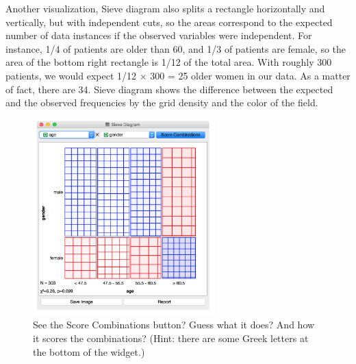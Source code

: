 Another visualization, Sieve diagram also splits a rectangle horizontally and vertically, but with independent cuts, so the areas correspond to the expected number of data instances if the observed variables were independent. For instance, 1/4 of patients are older than 60, and 1/3 of patients are female, so the area of the bottom right rectangle is 1/12 of the total area. With roughly 300 patients, we would expect 1/12 × 300 = 25 older women in our data. As a matter of fact, there are 34. Sieve diagram shows the difference between the expected and the observed frequencies by the grid density and the color of the field.

\begin{figure}
  \flushright
  \includegraphics[width=70mm]{basic_data_exploration-fig7.png}
  \caption{See the Score Combinations button? Guess what it does? And how it scores the combinations? (Hint: there are some Greek letters at the bottom of the widget.)}
  \label{fig:basic_data_exploration-fig7}
\end{figure}